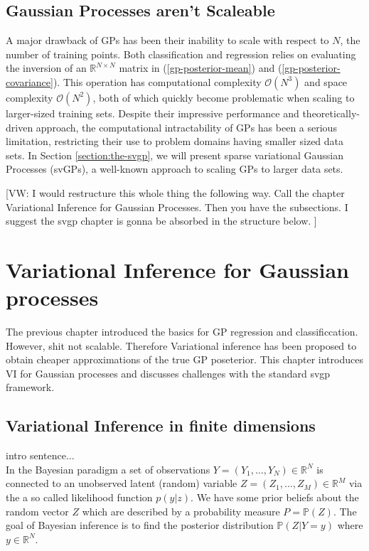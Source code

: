 \documentclass{article}
\newcommand{\vw}[1]{{\color{green} [VW: #1]}}
\newcommand{\bbP}{\mathbb{P}}
\newcommand{\bbR}{\mathbb{R}}
\numberwithin{equation}{section}
\begin{document}
\subsection{Gaussian Processes aren't Scaleable}\label{section:gp-problems}
A major drawback of GPs has been their inability to scale with respect to $N$, the number of training points. Both classification and regression relies on evaluating the inversion of an $\mathbb{R}^{N \times N}$ matrix in (\ref{gp-posterior-mean}) and (\ref{gp-posterior-covariance}). This operation has computational complexity $\mathcal{O}(N^3)$ and space complexity $\mathcal{O}(N^2)$, both of which quickly become problematic when scaling to larger-sized training sets. Despite their impressive performance and theoretically-driven approach, the computational intractability of GPs has been a serious limitation, restricting their use to problem domains having smaller sized data sets. In Section \ref{section:the-svgp}, we will present sparse variational Gaussian Processes (svGPs), a well-known approach to scaling GPs to larger data sets.

\newpage

\vw{I would restructure this whole thing the following way. Call the chapter Variational Inference for Gaussian Processes. Then you have the subsections. I suggest the svgp chapter is gonna be absorbed in the structure below.  }


\section{Variational Inference for Gaussian processes}
The previous chapter introduced the basics for GP regression and classificcation. However, shit not scalable. Therefore Variational inference has been proposed to obtain cheaper approximations of the true GP poseterior. This chapter introduces VI for Gaussian processes and discusses challenges with the standard svgp framework.

\subsection{Variational Inference in finite dimensions}
intro sentence... \\

In the Bayesian paradigm a set of observations $Y=(Y_1, \hdots, Y_N) \in \bbR^N$ is connected to an unobserved latent (random) variable $Z=(Z_1, \hdots, Z_M) \in \bbR^M$ via the a so called likelihood function $p(y|z)$. We have some prior beliefs about the random vector $Z$ which are described by a probability measure $P=\bbP(Z)$. The goal of Bayesian inference is to find  the posterior distribution $\bbP(Z|Y=y)$ where $y \in \bbR^N$.
\end{document}
